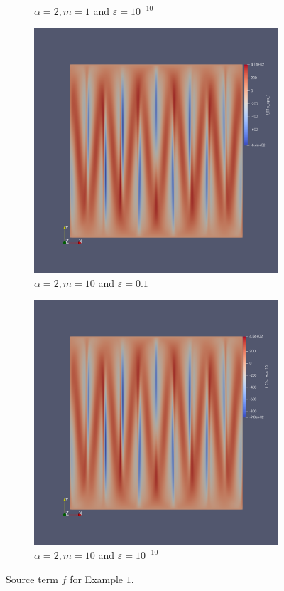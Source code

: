 \documentclass[12pt,a4paper]{article}
\begin{document}
\begin{figure}[H]
\begin{subfigure}{0.44\textwidth}
     \caption{$\alpha=2, m=1$ and $\varepsilon = 10^{-10}$}
 \end{subfigure}
 \begin{subfigure}{0.44\textwidth}
     \includegraphics[width=\textwidth]{Pics/uf/F_E1c_eps_1.png}
     \caption{$\alpha=2, m=10$ and $\varepsilon = 0.1$}
 \end{subfigure}
 \hfill
 \begin{subfigure}{0.44\textwidth}
     \includegraphics[width=\textwidth]{Pics/uf/f_E1c_eps_10.png}
     \caption{$\alpha=2, m=10$ and $\varepsilon = 10^{-10}$}
 \end{subfigure}
 \caption{Source term $f$ for Example $1$.} \label{E1_fs}
\end{figure}
\end{document}
